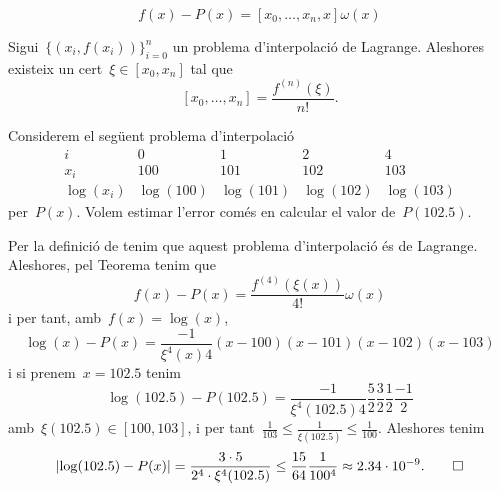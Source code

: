 \documentclass[../../main.tex]{subfiles}
\begin{document}
    \begin{observation}
        \[
            f(x)-P(x)=[x_{0},\dots,x_{n},x]\omega(x)
        \]
    \end{observation}
    \begin{corollary}
        Sigui~\(\{(x_{i},f(x_{i}))\}_{i=0}^{n}\) un problema d'interpolació de Lagrange.
        Aleshores existeix un cert~\(\xi\in[x_{0},x_{n}]\) tal que
        \[
            [x_{0},\dots,x_{n}]=\frac{f^{(n)}(\xi)}{n!}.
        \]
    \end{corollary}
    \begin{example}
        Considerem el següent problema d'interpolació
        \[\begin{array}{c|rrrr}
        i & 0 & 1 & 2 & 4\\\hline
        x_{i} & 100 & 101 & 102 & 103\\
        \log(x_{i}) & \log(100) & \log(101) & \log(102) & \log(103)
        \end{array}\]
        per~\(P(x)\).
        Volem estimar l'error comés en calcular el valor de~\(P(102.5)\).
    \end{example}
    \begin{solution}
        Per la definició de  tenim que aquest problema d'interpolació és de Lagrange.
        Aleshores, pel Teorema  tenim que
        \[
            f(x)-P(x)=\frac{f^{(4)}(\xi(x))}{4!}\omega(x)
        \]
        i per tant, amb~\(f(x)=\log(x)\),
        \[
            \log(x)-P(x)=\frac{-1}{\xi^{4}(x)4}(x-100)(x-101)(x-102)(x-103)
        \]
        i si prenem~\(x=102.5\) tenim
        \[
            \log(102.5)-P(102.5)=\frac{-1}{\xi^{4}(102.5)4}\frac{5}{2}\frac{3}{2}\frac{1}{2}\frac{-1}{2}
        \]
        amb~\(\xi(102.5)\in[100,103]\), i per tant~\(\frac{1}{103}\leq\frac{1}{\xi(102.5)}\leq\frac{1}{100}\).
        Aleshores tenim
        \[
            \abs{\log(102.5)-P(x)}=\frac{3\cdot5}{2^{4}\cdot\xi^{4}(102.5)}\leq\frac{15}{64}\frac{1}{100^{4}}\approx2.34\cdot10^{-9}.\qedhere
        \]
    \end{solution}
\end{document}
